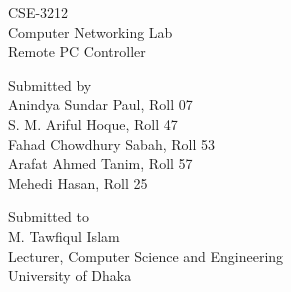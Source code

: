 \documentclass[12pt, a4paper]{article}
\begin{document}
	\begin{titlepage}
		\centering	
		
		\begin{Huge}
			CSE-3212\\
			\vspace{0.5cm}
			Computer Networking Lab\\
			\vspace{0.5cm}
			Remote PC Controller\\
		\end{Huge}

		\vspace{4cm}
		
		\begin{Large}
			Submitted by\\
			Anindya Sundar Paul, Roll 07\\
			S. M. Ariful Hoque, Roll 47\\
			Fahad Chowdhury Sabah, Roll 53\\
			Arafat Ahmed Tanim, Roll 57\\
			Mehedi Hasan, Roll 25\\
		\end{Large}
		
		\vspace{3cm}		
		
		\begin{Large}
			Submitted to\\
			M. Tawfiqul Islam\\
			Lecturer, Computer Science and Engineering\\
			University of Dhaka\\
		\end{Large}
	\end{titlepage}
\end{document}
